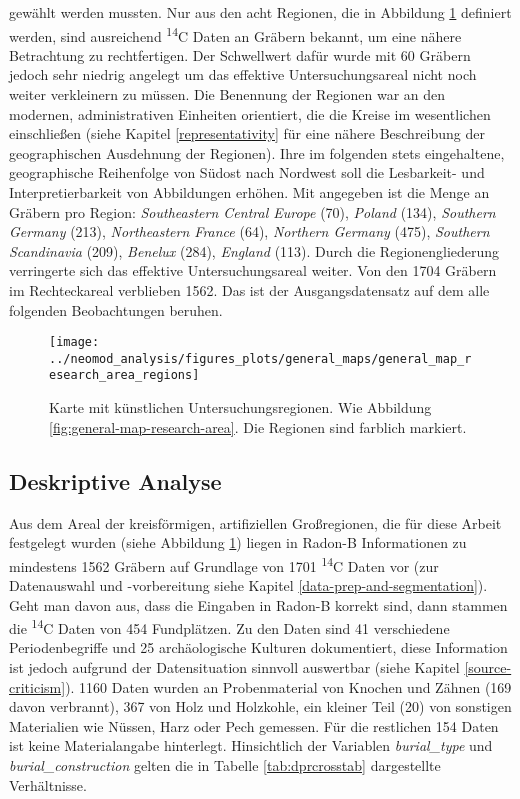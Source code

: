 \documentclass[openany,twoside,twocolumn]{book}
\begin{document}
gewählt werden mussten. Nur aus den acht Regionen, die in Abbildung
\ref{fig:general-map-research-area-regions} definiert werden, sind
ausreichend \textsuperscript{14}C Daten an Gräbern bekannt, um eine
nähere Betrachtung zu rechtfertigen. Der Schwellwert dafür wurde mit 60
Gräbern jedoch sehr niedrig angelegt um das effektive Untersuchungsareal
nicht noch weiter verkleinern zu müssen. Die Benennung der Regionen war
an den modernen, administrativen Einheiten orientiert, die die Kreise im
wesentlichen einschließen (siehe Kapitel \ref{representativity} für eine
nähere Beschreibung der geographischen Ausdehnung der Regionen). Ihre im
folgenden stets eingehaltene, geographische Reihenfolge von Südost nach
Nordwest soll die Lesbarkeit- und Interpretierbarkeit von Abbildungen
erhöhen. Mit angegeben ist die Menge an Gräbern pro Region:
\emph{Southeastern Central Europe} (70), \emph{Poland} (134),
\emph{Southern Germany} (213), \emph{Northeastern France} (64),
\emph{Northern Germany} (475), \emph{Southern Scandinavia} (209),
\emph{Benelux} (284), \emph{England} (113). Durch die Regionengliederung
verringerte sich das effektive Untersuchungsareal weiter. Von den 1704
Gräbern im Rechteckareal verblieben 1562. Das ist der Ausgangsdatensatz
auf dem alle folgenden Beobachtungen beruhen.

\begin{figure}
\texttt{[image: ../neomod\_analysis/figures\_plots/general\_maps/general\_map\_research\_area\_regions]} \caption[Karte mit künstlichen Untersuchungsregionen]{Karte mit künstlichen Untersuchungsregionen. Wie Abbildung \ref{fig:general-map-research-area}. Die Regionen sind farblich markiert.}\label{fig:general-map-research-area-regions}
\end{figure}

\hypertarget{descriptive-data-analysis}{%
\subsection{Deskriptive Analyse}\label{descriptive-data-analysis}}

Aus dem Areal der kreisförmigen, artifiziellen Großregionen, die für
diese Arbeit festgelegt wurden (siehe Abbildung
\ref{fig:general-map-research-area-regions}) liegen in Radon-B
Informationen zu mindestens 1562 Gräbern auf Grundlage von 1701
\textsuperscript{14}C Daten vor (zur Datenauswahl und -vorbereitung
siehe Kapitel \ref{data-prep-and-segmentation}). Geht man davon aus,
dass die Eingaben in Radon-B korrekt sind, dann stammen die
\textsuperscript{14}C Daten von 454 Fundplätzen. Zu den Daten sind 41
verschiedene Periodenbegriffe und 25 archäologische Kulturen
dokumentiert, diese Information ist jedoch aufgrund der Datensituation
sinnvoll auswertbar (siehe Kapitel \ref{source-criticism}). 1160 Daten
wurden an Probenmaterial von Knochen und Zähnen (169 davon verbrannt),
367 von Holz und Holzkohle, ein kleiner Teil (20) von sonstigen
Materialien wie Nüssen, Harz oder Pech gemessen. Für die restlichen 154
Daten ist keine Materialangabe hinterlegt. Hinsichtlich der Variablen
\emph{burial\_type} und \emph{burial\_construction} gelten die in
Tabelle \ref{tab:dprcrosstab} dargestellte Verhältnisse.
\end{document}
